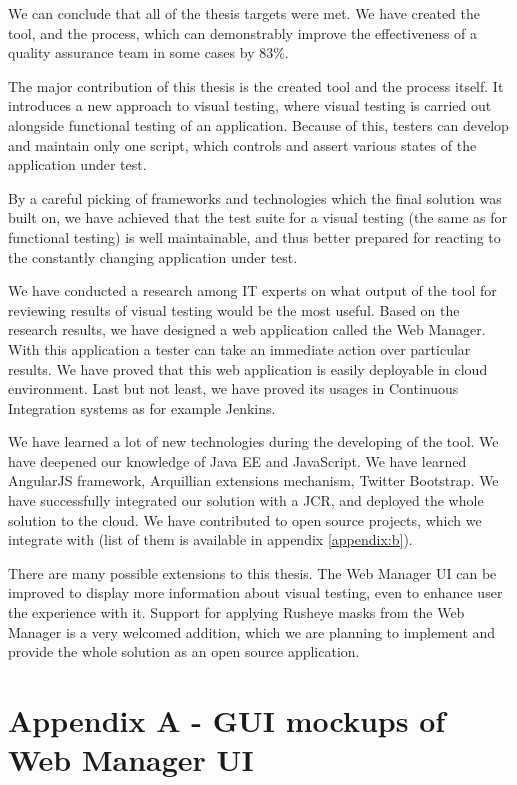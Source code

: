 \documentclass[11pt,oneside,final]{fithesis2}
\begin{document}
We can conclude that all of the thesis targets were met. We have created the tool, and the process, which can demonstrably improve the effectiveness
of a quality assurance team in some cases by 83\%.

The major contribution of this thesis is the created tool and the process itself. It introduces a new approach to visual testing, where
visual testing is carried out alongside functional testing of an application. Because of this, testers can develop and maintain only one
script, which controls and assert various states of the application under test.

By a careful picking of frameworks and technologies which the final solution was built on, we have 
achieved that the test suite for a visual testing (the same as for functional testing) is well maintainable, and thus better prepared for reacting 
to the constantly changing application under test.

We have conducted a research among IT experts on what output of the tool for reviewing results of visual testing would be the most useful. Based
on the research results, we have designed a web application called the Web Manager. With this application a tester can take an immediate action
over particular results. We have proved that this web application is easily deployable in cloud environment. Last but
not least, we have proved its usages in Continuous Integration systems as for example Jenkins.

We have learned a lot of new technologies during the developing of the tool. We have deepened our knowledge of Java EE and JavaScript. 
We have learned AngularJS framework, Arquillian extensions mechanism, Twitter Bootstrap. We have successfully integrated our solution with
a JCR, and deployed the whole solution to the cloud. We have contributed to open source projects, which we integrate 
with (list of them is available in appendix \ref{appendix:b}).

There are many possible extensions to this thesis. The Web Manager UI can be improved to display more information about visual testing,
even to enhance user the experience with it. Support for applying Rusheye masks from the Web Manager is a very welcomed addition, which we are planning
to implement and provide the whole solution as an open source application.

\appendix
\chapter{Appendix A - GUI mockups of Web Manager UI}
\label{appendeix:a}
\end{document}
